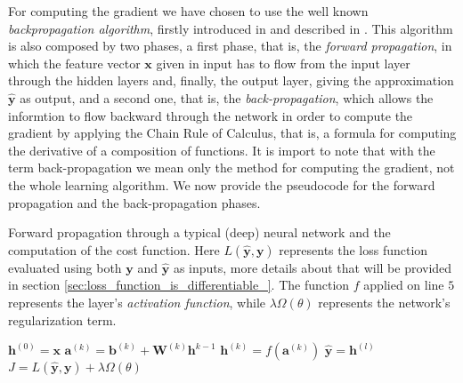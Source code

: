		For computing the gradient we have chosen to use
		the well known \textit{backpropagation algorithm}, firstly introduced in \cite{10028086174} and described
		in \cite{Goodfellow-et-al-2016,haykin2009neural,mitchell1997machine}. This algorithm is
		also composed by two phases, a first phase, that is, the \textit{forward propagation}, in which the
		feature vector $\mathbf{x}$ given in input has to flow from the input layer through the hidden layers and,
		finally, the output layer, giving the approximation $\hat{\mathbf{y}}$ as output, and a second one, that
		is, the \textit{back-propagation}, which allows the informtion to flow backward through the network in
		order to compute the gradient by applying the Chain Rule of Calculus, that is, a formula for computing the
		derivative of a composition of functions. It is import to note that with the term back-propagation we mean
		only the method for computing the gradient, not the whole learning algorithm. We now provide the
		pseudocode for the forward propagation and the back-propagation phases.

		\begin{algorithm}[H]
			\caption{Forward propagation through a typical (deep) neural network and the computation of the cost
			function. Here $L(\hat{\mathbf{y}}, \mathbf{y})$ represents the loss function evaluated using both
			$\mathbf{y}$ and $\hat{\mathbf{y}}$ as inputs, more details about that will be provided in
			section \ref{sec:loss_function_is_differentiable_}. The function $f$ applied on line $5$ represents
			the layer's \textit{activation function}, while $\lambda \Omega(\theta)$ represents the
			network's regularization term.}
			\label{alg:forward_propagation}
			\begin{algorithmic}[1]
					\State $\mathbf{h}^{(0)} = \mathbf{x}$
						\State $\mathbf{a}^{(k)} = \mathbf{b}^{(k)} + \mathbf{W}^{(k)}\mathbf{h}^{k - 1}$
						\State $\mathbf{h}^{(k)} = f(\mathbf{a}^{(k)})$
					\EndFor
					\State $\hat{\mathbf{y}} = \mathbf{h}^{(l)}$
					\State $J = L(\hat{\mathbf{y}}, \mathbf{y}) + \lambda \Omega(\theta)$
				\EndProcedure
			\end{algorithmic}
		\end{algorithm}

